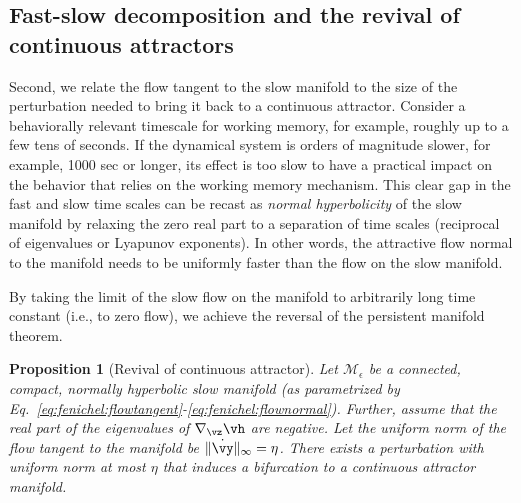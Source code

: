\documentclass{article} %
\newcounter{ct}
\newcommand{\manifold}{\mathcal{M}}
\newtheorem{prop}{Proposition}
\theoremstyle{definition}
\theoremstyle{remark}
\begin{document}

\subsection{Fast-slow decomposition and the revival of continuous attractors}\label{sec:revival}
Second, we relate the flow tangent to the slow manifold to the size of the perturbation needed to bring it back to a continuous attractor.
Consider a behaviorally relevant timescale for working memory, for example, roughly up to a few tens of seconds.
If the dynamical system is orders of magnitude slower, for example, 1000 sec or longer, its effect is too slow to have a practical impact on the behavior that relies on the working memory mechanism.
This clear gap in the fast and slow time scales can be recast as \emph{normal hyperbolicity} of the slow manifold by relaxing the zero real part to a separation of time scales (reciprocal of eigenvalues or Lyapunov exponents).
In other words, the attractive flow normal to the manifold needs to be uniformly faster than the flow on the slow manifold.

By taking the limit of the slow flow on the manifold to arbitrarily long time constant (i.e., to zero flow), we achieve the reversal of the persistent manifold theorem.
\begin{prop}[Revival of continuous attractor]\label{prop:revival}
Let \(\manifold_{\epsilon}\) be a connected, compact, normally hyperbolic slow manifold  (as parametrized by Eq.~\eqref{eq:fenichel:flowtangent}-\eqref{eq:fenichel:flownormal}).
Further, assume that the real part of the eigenvalues of \(\nabla_{\vz} \vh\) are negative. %
Let the uniform norm of the flow tangent to the manifold be \(\|\dot \vy\|_{\infty}=\eta\).
There exists a perturbation with uniform norm at most \(\eta\) that induces a bifurcation to a continuous attractor manifold. %
\end{prop}
\end{document}
